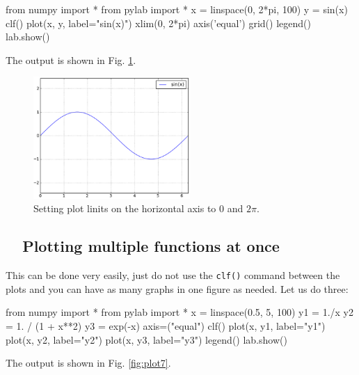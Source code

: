 \begin{bluecode}
from numpy import *
from pylab import *
x = linspace(0, 2*pi, 100)
y = sin(x)
clf()
plot(x, y, label="sin(x)")
xlim(0, 2*pi)
axis('equal')
grid()
legend()
lab.show()
\end{bluecode}
\noindent
The output is shown in Fig. \ref{fig:plot9}.
\newpage

\begin{figure}[!ht]
\begin{center}
\includegraphics[width=0.53\textwidth]{imgp/plot9.png}
\end{center}
\vspace{-4mm}
\caption{Setting plot linits on the horizontal axis to $0$ and $2\pi$.}
\label{fig:plot9}
\vspace{-2mm}
\end{figure}
\noindent


\subsection{\ \ Plotting multiple functions at once}

This can be done very easily, just do not use the {\tt clf()}
command between the plots and you can have as many graphs 
in one figure as needed. Let us do three:

\begin{bluecode}
from numpy import *
from pylab import *
x = linspace(0.5, 5, 100)
y1 = 1./x
y2 = 1. / (1 + x**2)
y3 = exp(-x)
axis=("equal")
clf()
plot(x, y1, label="y1")
plot(x, y2, label="y2")
plot(x, y3, label="y3")
legend()
lab.show()
\end{bluecode}
\noindent
The output is shown in Fig. \ref{fig:plot7}.
\newpage

